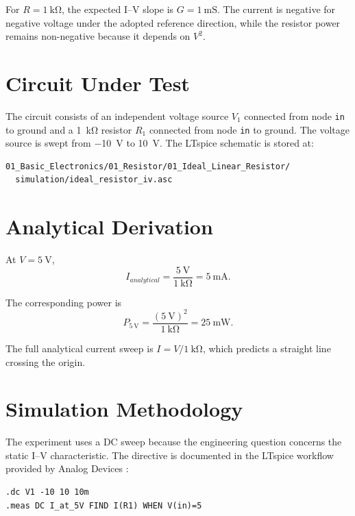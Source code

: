 \documentclass[11pt,a4paper]{article}
\begin{document}
For $R=\SI{1}{\kilo\ohm}$, the expected I--V slope is $G=\SI{1}{\milli\siemens}$. The current is negative for negative voltage under the adopted reference direction, while the resistor power remains non-negative because it depends on $V^2$.

\section{Circuit Under Test}

The circuit consists of an independent voltage source $V_1$ connected from node \texttt{in} to ground and a \SI{1}{\kilo\ohm} resistor $R_1$ connected from node \texttt{in} to ground. The voltage source is swept from \SI{-10}{\volt} to \SI{10}{\volt}. The LTspice schematic is stored at:

\begin{verbatim}
01_Basic_Electronics/01_Resistor/01_Ideal_Linear_Resistor/
  simulation/ideal_resistor_iv.asc
\end{verbatim}

\section{Analytical Derivation}

At $V=\SI{5}{\volt}$,
\begin{equation}
I_{analytical}=\frac{\SI{5}{\volt}}{\SI{1}{\kilo\ohm}}
=\SI{5}{\milli\ampere}.
\end{equation}

The corresponding power is
\begin{equation}
P_{5\,\mathrm{V}} = \frac{(\SI{5}{\volt})^2}{\SI{1}{\kilo\ohm}}
= \SI{25}{\milli\watt}.
\end{equation}

The full analytical current sweep is $I=V/\SI{1}{\kilo\ohm}$, which predicts a straight line crossing the origin.

\section{Simulation Methodology}

The experiment uses a DC sweep because the engineering question concerns the static I--V characteristic. The directive is documented in the LTspice workflow provided by Analog Devices \cite{analogdevices_ltspice}:

\begin{verbatim}
.dc V1 -10 10 10m
.meas DC I_at_5V FIND I(R1) WHEN V(in)=5
\end{verbatim}
\end{document}
